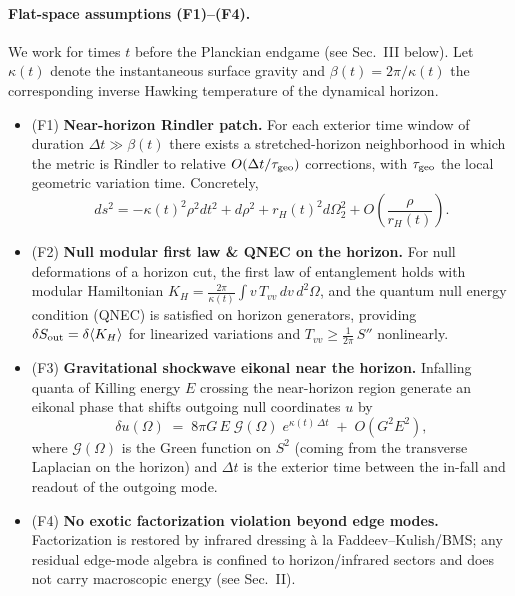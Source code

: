 \paragraph{Flat-space assumptions (F1)--(F4).}
We work for times $t$ before the Planckian endgame (see Sec.~III below). Let $\kappa(t)$ denote the instantaneous surface gravity and $\beta(t)=2\pi/\kappa(t)$ the corresponding inverse Hawking temperature of the dynamical horizon.
\begin{itemize}
  \item (F1) \textbf{Near-horizon Rindler patch.} For each exterior time window of duration $\Delta t \gg \beta(t)$ there exists a stretched-horizon neighborhood in which the metric is Rindler to relative $O(\Delta t/\tau_{\rm geo})$ corrections, with $\tau_{\rm geo}$ the local geometric variation time. Concretely,
  \[
  ds^2 = -\kappa(t)^2 \rho^2 dt^2 + d\rho^2 + r_H(t)^2 d\Omega_2^2 + O\!\left(\frac{\rho}{r_H(t)}\right).
  \]
  \item (F2) \textbf{Null modular first law \& QNEC on the horizon.} For null deformations of a horizon cut, the first law of entanglement holds with modular Hamiltonian $K_H = \frac{2\pi}{\kappa(t)}\int v\,T_{vv}\, d v\, d^2\Omega$, and the quantum null energy condition (QNEC) is satisfied on horizon generators, providing
  \(
  \delta S_{\rm out} = \delta\langle K_H\rangle
  \)
  for linearized variations and $T_{vv}\ge \frac{1}{2\pi}\,S''$ nonlinearly.
  \item (F3) \textbf{Gravitational shockwave eikonal near the horizon.} Infalling quanta of Killing energy $E$ crossing the near-horizon region generate an eikonal phase that shifts outgoing null coordinates $u$ by
  \[
  \delta u(\Omega)\;=\; 8\pi G\,E\; \mathcal{G}(\Omega)\; e^{\kappa(t)\, \Delta t}\;+\;O(G^2E^2),
  \]
  where $\mathcal{G}(\Omega)$ is the Green function on $S^2$ (coming from the transverse Laplacian on the horizon) and $\Delta t$ is the exterior time between the in-fall and readout of the outgoing mode.
  \item (F4) \textbf{No exotic factorization violation beyond edge modes.} Factorization is restored by infrared dressing à la Faddeev--Kulish/BMS; any residual edge-mode algebra is confined to horizon/infrared sectors and does not carry macroscopic energy (see Sec.~II).
\end{itemize}

